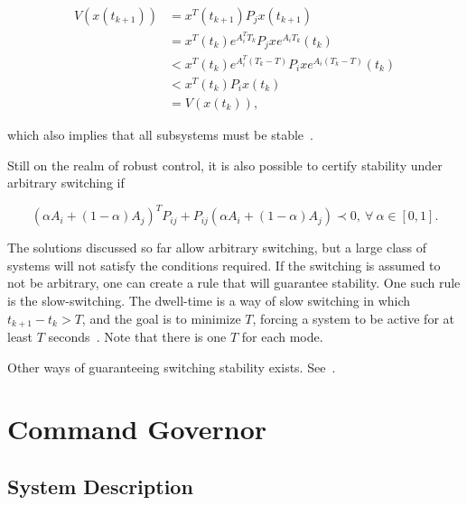 \begin{align}
	V(x(t_{k+1})) & = x^{T}(t_{k+1})P_{j}x(t_{k+1})                                     \\
	              & = x^{T}(t_{k})e^{A^{T}_{i}T_{k}}P_{j}xe^{A_{i}T_{k}}(t_{k})         \\
	              & < x^{T}(t_{k})e^{A^{T}_{i}(T_{k}-T)}P_{i}xe^{A_{i}(T_{k}-T)}(t_{k}) \\
	              & < x^{T}(t_{k})P_{i}x(t_{k})                                         \\
	              & = V(x(t_{k})),
\end{align}

which also implies that all subsystems must be
stable~\parencite{geromel.colaneri:stabilization}.

Still on the realm of robust control, it is also possible to certify stability
under arbitrary switching if~\parencite{liberzon.morse:basic}

\begin{equation}
	(\alpha{}A_{i}+(1-\alpha)A_{j})^{T}P_{ij}+P_{ij}(\alpha{}A_{i}+(1-\alpha)A_{j}) \prec{} 0,~\forall{}~\alpha{}\in{}[0,1].
\end{equation}

The solutions discussed so far allow arbitrary switching, but a large class of
systems will not satisfy the conditions required. If the switching is assumed to
not be arbitrary, one can create a rule that will guarantee stability. One such
rule is the slow-switching. The dwell-time is a way of slow switching in which
\(t_{k+1}-t_{k}>T\), and the goal is to minimize \(T\), forcing a system to be
active for at least \(T\)
seconds~\parencite{chesi.colaneri.ea:computing,franzè.lucia.ea:command,liberzon.morse:basic}.
Note that there is one \(T\) for each mode.

Other ways of guaranteeing switching stability exists.
See~\textcite{geromel.deaecto:stability,liberzon.morse:basic,geromel.colaneri:stabilization}.

\section{Command Governor}%
\label{sec:command-governor}

\subsection{System Description}%
\label{subsec:system-description}


